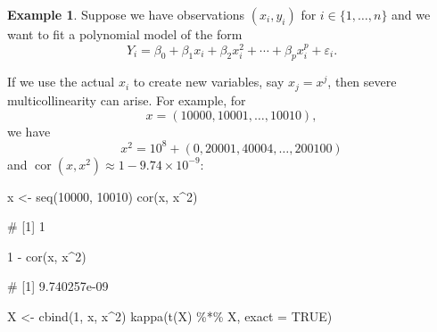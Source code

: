 \documentclass[
  a4paper,
]{article}
\newenvironment{Shaded}{\begin{snugshade}}{\end{snugshade}}
\newcommand{\AttributeTok}[1]{\textcolor[rgb]{0.77,0.63,0.00}{#1}}
\newcommand{\ConstantTok}[1]{\textcolor[rgb]{0.00,0.00,0.00}{#1}}
\newcommand{\DecValTok}[1]{\textcolor[rgb]{0.00,0.00,0.81}{#1}}
\newcommand{\FunctionTok}[1]{\textcolor[rgb]{0.00,0.00,0.00}{#1}}
\newcommand{\NormalTok}[1]{#1}
\newcommand{\OtherTok}[1]{\textcolor[rgb]{0.56,0.35,0.01}{#1}}
\newcommand{\SpecialCharTok}[1]{\textcolor[rgb]{0.00,0.00,0.00}{#1}}
\theoremstyle{definition}
\theoremstyle{definition}
\newtheorem{example}{Example}[section]
\theoremstyle{definition}
\theoremstyle{definition}
\theoremstyle{remark}
\begin{document}
\begin{example}
Suppose we have observations \((x_i, y_i)\) for
\(i\in \{1, \ldots, n\}\) and we want to fit a polynomial model of the form
\begin{equation*}
  Y_i
  = \beta_0 + \beta_1 x_i + \beta_2 x_i^2 + \cdots + \beta_p x_i^p + \varepsilon_i.
\end{equation*}

If we use the actual \(x_i\) to create new variables, say \(x_j = x^j\), then
severe multicollinearity can arise. For example, for
\begin{equation*}
  x
  = (10000, 10001, \ldots, 10010),
\end{equation*}
we have
\begin{equation*}
  x^2
  = 10^8 + (0, 20001, 40004, \ldots, 200100)
\end{equation*}
and \(\mathop{\mathrm{cor}}(x, x^2) \approx 1 - 9.74\times 10^{-9}\):

\begin{Shaded}
\begin{Highlighting}[]
\NormalTok{x }\OtherTok{\textless{}{-}} \FunctionTok{seq}\NormalTok{(}\DecValTok{10000}\NormalTok{, }\DecValTok{10010}\NormalTok{)}
\FunctionTok{cor}\NormalTok{(x, x}\SpecialCharTok{\^{}}\DecValTok{2}\NormalTok{)}
\end{Highlighting}
\end{Shaded}

\begin{Shaded}
\begin{Highlighting}[]
\NormalTok{\# [1] 1}
\end{Highlighting}
\end{Shaded}

\begin{Shaded}
\begin{Highlighting}[]
\DecValTok{1} \SpecialCharTok{{-}} \FunctionTok{cor}\NormalTok{(x, x}\SpecialCharTok{\^{}}\DecValTok{2}\NormalTok{)}
\end{Highlighting}
\end{Shaded}

\begin{Shaded}
\begin{Highlighting}[]
\NormalTok{\# [1] 9.740257e{-}09}
\end{Highlighting}
\end{Shaded}

\begin{Shaded}
\begin{Highlighting}[]
\NormalTok{X }\OtherTok{\textless{}{-}} \FunctionTok{cbind}\NormalTok{(}\DecValTok{1}\NormalTok{, x, x}\SpecialCharTok{\^{}}\DecValTok{2}\NormalTok{)}
\FunctionTok{kappa}\NormalTok{(}\FunctionTok{t}\NormalTok{(X) }\SpecialCharTok{\%*\%}\NormalTok{ X, }\AttributeTok{exact =} \ConstantTok{TRUE}\NormalTok{)}
\end{Highlighting}
\end{Shaded}


\end{example}
\end{document}

